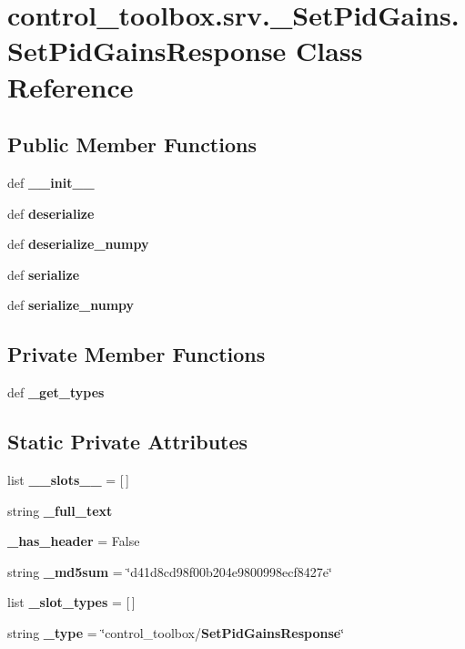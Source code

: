\section{control\-\_\-toolbox.\-srv.\-\_\-\-Set\-Pid\-Gains.\-Set\-Pid\-Gains\-Response \-Class \-Reference}
\label{classcontrol__toolbox_1_1srv_1_1__SetPidGains_1_1SetPidGainsResponse}
\subsection*{\-Public \-Member \-Functions}
\begin{DoxyCompactItemize}
\item 
def {\bf \-\_\-\-\_\-init\-\_\-\-\_\-}
\item 
def {\bf deserialize}
\item 
def {\bf deserialize\-\_\-numpy}
\item 
def {\bf serialize}
\item 
def {\bf serialize\-\_\-numpy}
\end{DoxyCompactItemize}
\subsection*{\-Private \-Member \-Functions}
\begin{DoxyCompactItemize}
\item 
def {\bf \-\_\-get\-\_\-types}
\end{DoxyCompactItemize}
\subsection*{\-Static \-Private \-Attributes}
\begin{DoxyCompactItemize}
\item 
list {\bf \-\_\-\-\_\-slots\-\_\-\-\_\-} = [$\,$]
\item 
string {\bf \-\_\-full\-\_\-text}
\item 
{\bf \-\_\-has\-\_\-header} = \-False
\item 
string {\bf \-\_\-md5sum} = \char`\"{}d41d8cd98f00b204e9800998ecf8427e\char`\"{}
\item 
list {\bf \-\_\-slot\-\_\-types} = [$\,$]
\item 
string {\bf \-\_\-type} = \char`\"{}control\-\_\-toolbox/{\bf \-Set\-Pid\-Gains\-Response}\char`\"{}
\end{DoxyCompactItemize}


